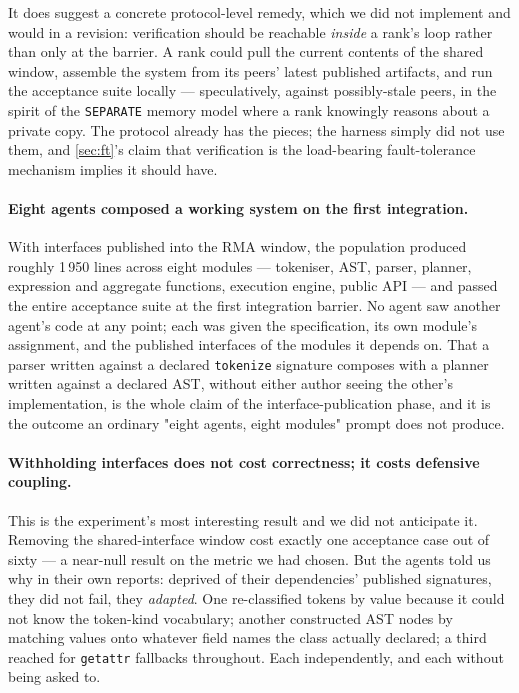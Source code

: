 \documentclass[10pt,twocolumn]{article}
\theoremstyle{definition}
\theoremstyle{plain}
\newcommand{\code}[1]{\texttt{\small #1}}
\begin{document}
It does suggest a concrete protocol-level remedy, which we did not implement and would
in a revision: verification should be reachable \emph{inside} a rank's loop rather than
only at the barrier. A rank could pull the current contents of the shared window,
assemble the system from its peers' latest published artifacts, and run the acceptance
suite locally --- speculatively, against possibly-stale peers, in the spirit of the
\code{SEPARATE} memory model where a rank knowingly reasons about a private copy. The
protocol already has the pieces; the harness simply did not use them, and
\cref{sec:ft}'s claim that verification is the load-bearing fault-tolerance mechanism
implies it should have.

\paragraph{Eight agents composed a working system on the first integration.} With
interfaces published into the RMA window, the population produced roughly 1\,950
lines across eight modules --- tokeniser, AST, parser, planner, expression and
aggregate functions, execution engine, public API --- and passed the entire
acceptance suite at the first integration barrier. No agent saw another agent's code
at any point; each was given the specification, its own module's assignment, and the
published interfaces of the modules it depends on. That a parser written against a
declared \code{tokenize} signature composes with a planner written against a declared
AST, without either author seeing the other's implementation, is the whole claim of
the interface-publication phase, and it is the outcome an ordinary "eight agents,
eight modules" prompt does not produce.

\paragraph{Withholding interfaces does not cost correctness; it costs defensive
coupling.} This is the experiment's most interesting result and we did not anticipate
it. Removing the shared-interface window cost exactly one acceptance case out of sixty
--- a near-null result on the metric we had chosen. But the agents told us why in their
own reports: deprived of their dependencies' published signatures, they did not fail,
they \emph{adapted}. One re-classified tokens by value because it could not know the
token-kind vocabulary; another constructed AST nodes by matching values onto whatever
field names the class actually declared; a third reached for \code{getattr} fallbacks
throughout. Each independently, and each without being asked to.
\end{document}
